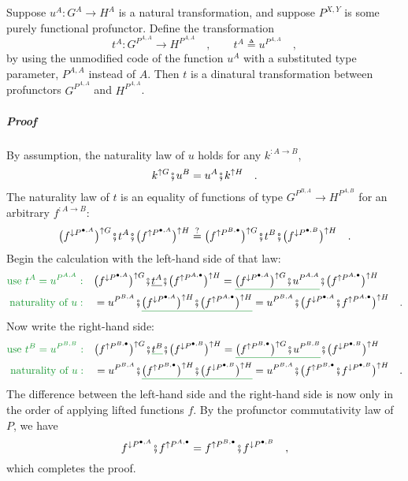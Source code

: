 Suppose $u^{A}:G^{A}\rightarrow H^{A}$ is a natural transformation,
and suppose $P^{X,Y}$ is some purely functional profunctor. Define
the transformation
\[
t^{A}:G^{P^{A,A}}\rightarrow H^{P^{A,A}}\quad,\quad\quad t^{A}\triangleq u^{P^{A,A}}\quad,
\]
by using the unmodified code of the function $u^{A}$ with a substituted
type parameter, $P^{A,A}$ instead of $A$. Then $t$ is a dinatural
transformation between profunctors $G^{P^{A,A}}$ and $H^{P^{A,A}}$.

\subparagraph{Proof}

By assumption, the naturality law of $u$ holds for any $k^{:A\rightarrow B}$,
\[
k^{\uparrow G}\bef u^{B}=u^{A}\bef k^{\uparrow H}\quad.
\]
The naturality law of $t$ is an equality of functions of type $G^{P^{B,A}}\rightarrow H^{P^{A,B}}$
for an arbitrary $f^{:A\rightarrow B}$:
\[
\big(f^{\downarrow P^{\bullet,A}}\big)^{\uparrow G}\bef t^{A}\bef\big(f^{\uparrow P^{\bullet,A}}\big)^{\uparrow H}\overset{?}{=}\big(f^{\uparrow P^{B,\bullet}}\big)^{\uparrow G}\bef t^{B}\bef\big(f^{\downarrow P^{\bullet,B}}\big)^{\uparrow H}\quad.
\]
Begin the calculation with the left-hand side of that law:
\begin{align*}
{\color{greenunder}\text{use }t^{A}=u^{P^{A,A}}:}\quad & \big(f^{\downarrow P^{\bullet,A}}\big)^{\uparrow G}\bef\underline{t^{A}}\bef\big(f^{\uparrow P^{A,\bullet}}\big)^{\uparrow H}=\gunderline{\big(f^{\downarrow P^{\bullet,A}}\big)^{\uparrow G}\bef u^{P^{A,A}}}\bef\big(f^{\uparrow P^{A,\bullet}}\big)^{\uparrow H}\\
{\color{greenunder}\text{naturality of }u:}\quad & =u^{P^{B,A}}\bef\gunderline{\big(f^{\downarrow P^{\bullet,A}}\big)^{\uparrow H}\bef\big(f^{\uparrow P^{A,\bullet}}\big)^{\uparrow H}}=u^{P^{B,A}}\bef\big(f^{\downarrow P^{\bullet,A}}\bef f^{\uparrow P^{A,\bullet}}\big)^{\uparrow H}\quad.
\end{align*}
Now write the right-hand side:
\begin{align*}
{\color{greenunder}\text{use }t^{B}=u^{P^{B,B}}:}\quad & \big(f^{\uparrow P^{B,\bullet}}\big)^{\uparrow G}\bef\gunderline{t^{B}}\bef\big(f^{\downarrow P^{\bullet,B}}\big)^{\uparrow H}=\gunderline{\big(f^{\uparrow P^{B,\bullet}}\big)^{\uparrow G}\bef u^{P^{B,B}}}\bef\big(f^{\downarrow P^{\bullet,B}}\big)^{\uparrow H}\\
{\color{greenunder}\text{naturality of }u:}\quad & =u^{P^{B,A}}\bef\gunderline{\big(f^{\uparrow P^{B,\bullet}}\big)^{\uparrow H}\bef\big(f^{\downarrow P^{\bullet,B}}\big)^{\uparrow H}}=u^{P^{B,A}}\bef\big(f^{\uparrow P^{B,\bullet}}\bef f^{\downarrow P^{\bullet,B}}\big)^{\uparrow H}\quad.
\end{align*}
The difference between the left-hand side and the right-hand side
is now only in the order of applying lifted functions $f$. By the
profunctor commutativity law of $P$, we have
\[
f^{\downarrow P^{\bullet,A}}\bef f^{\uparrow P^{A,\bullet}}=f^{\uparrow P^{B,\bullet}}\bef f^{\downarrow P^{\bullet,B}}\quad,
\]
which completes the proof.

